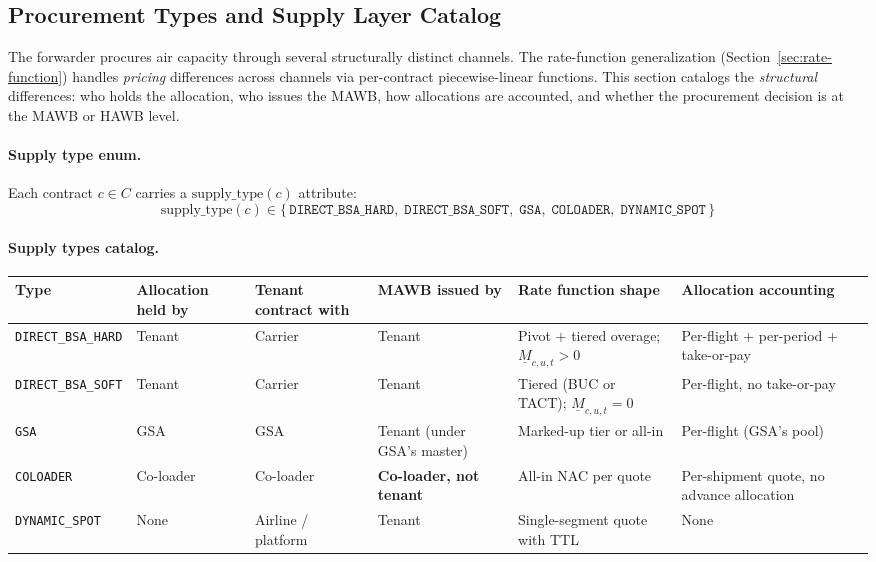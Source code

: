 \documentclass[11pt,a4paper]{article}
\theoremstyle{definition}
\begin{document}
\subsection{Procurement Types and Supply Layer Catalog}
\label{sec:procurement-types}

The forwarder procures air capacity through several structurally distinct channels.
The rate-function generalization (Section~\ref{sec:rate-function}) handles
\emph{pricing} differences across channels via per-contract piecewise-linear
functions. This section catalogs the \emph{structural} differences: who holds the
allocation, who issues the MAWB, how allocations are accounted, and whether the
procurement decision is at the MAWB or HAWB level.

\paragraph{Supply type enum.}
Each contract \(c \in C\) carries a \(\text{supply\_type}(c)\) attribute:
\begin{equation*}
  \text{supply\_type}(c) \in \{\,\texttt{DIRECT\_BSA\_HARD},\;
    \texttt{DIRECT\_BSA\_SOFT},\;
    \texttt{GSA},\;
    \texttt{COLOADER},\;
    \texttt{DYNAMIC\_SPOT}\,\}
\end{equation*}

\paragraph{Supply types catalog.}
\begin{center}
\begin{tabular}{p{2.2cm}p{2.2cm}p{2.2cm}p{2.3cm}p{2.5cm}p{2.2cm}}
\toprule
Type & Allocation held by & Tenant contract with & MAWB issued by & Rate function shape & Allocation accounting \\
\midrule
\texttt{DIRECT\_BSA\_HARD} & Tenant & Carrier & Tenant & Pivot + tiered overage; \(\underline{M}_{c,u,t} > 0\) & Per-flight + per-period + take-or-pay \\[0.4em]
\texttt{DIRECT\_BSA\_SOFT} & Tenant & Carrier & Tenant & Tiered (BUC or TACT); \(\underline{M}_{c,u,t} = 0\) & Per-flight, no take-or-pay \\[0.4em]
\texttt{GSA} & GSA & GSA & Tenant (under GSA's master) & Marked-up tier or all-in & Per-flight (GSA's pool) \\[0.4em]
\texttt{COLOADER} & Co-loader & Co-loader & \textbf{Co-loader, not tenant} & All-in NAC per quote & Per-shipment quote, no advance allocation \\[0.4em]
\texttt{DYNAMIC\_SPOT} & None & Airline / platform & Tenant & Single-segment quote with TTL & None \\
\bottomrule
\end{tabular}
\end{center}
\end{document}
